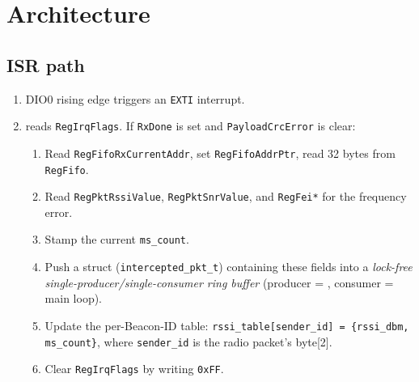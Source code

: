 \documentclass[11pt,letterpaper]{article}
\begin{document}

\newpage
\section{Architecture}

\subsection{ISR path}
\begin{enumerate}[leftmargin=2em]
	\item DIO0 rising edge triggers an \texttt{EXTI} interrupt.
	\item \ISR{} reads \texttt{RegIrqFlags}. If \texttt{RxDone} is set and \texttt{PayloadCrcError} is clear:
	\begin{enumerate}[leftmargin=1.2em, label=(\alph*)]
		\item Read \texttt{RegFifoRxCurrentAddr}, set \texttt{RegFifoAddrPtr}, read 32 bytes from \texttt{RegFifo}.
		\item Read \texttt{RegPktRssiValue}, \texttt{RegPktSnrValue}, and \texttt{RegFei*} for the frequency error.
		\item Stamp the current \texttt{ms\_count}.
		\item Push a struct (\texttt{intercepted\_pkt\_t}) containing these fields into a \textit{lock-free single-producer/single-consumer ring buffer} (producer = \ISR{}, consumer = main loop).
		\item Update the per-Beacon-ID \RSSI{} table: \texttt{rssi\_table[sender\_id] = \{rssi\_dbm, ms\_count\}}, where \texttt{sender\_id} is the radio packet's byte[2].
		\item Clear \texttt{RegIrqFlags} by writing \texttt{0xFF}.
	\end{enumerate}
\end{enumerate}
\end{document}
